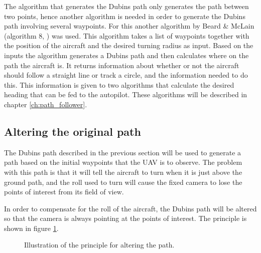 The algorithm that generates the Dubins path only generates the path between two points, hence another algorithm is needed in order to generate the Dubins path involving several waypoints. For this another algorithm by Beard \& McLain (algorithm 8, \cite{suaBEARD}) was used. This algorithm takes a list of waypoints together with the position of the aircraft and the desired turning radius as input. Based on the inputs the algorithm generates a Dubins path and then calculates where on the path the aircraft is. It returns information about whether or not the aircraft should follow a straight line or track a circle, and the information needed to do this. This information is given to two algorithms that calculate the desired heading that can be fed to the autopilot. These algorithms will be described in chapter \ref{ch:path_follower}.


\subsection{Altering the original path}

The Dubins path described in the previous section will be used to generate a path based on the initial waypoints that the UAV is to observe. The problem with this path is that it will tell the aircraft to turn when it is just above the ground path, and the roll used to turn will cause the fixed camera to lose the points of interest from its field of view. 

In order to compensate for the roll of the aircraft, the Dubins path will be altered so that the camera is always pointing at the points of interest. The principle is shown in figure \ref{fig:altered_path}. 

\begin{figure}[!ht]
    \centering
    \caption{Illustration of the principle for altering the path.}
	\label{fig:altered_path}
\end{figure}

